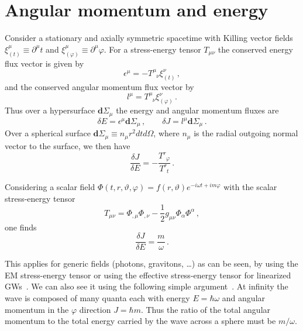 \documentclass[11pt]{article}
\newcommand{\be}{\begin{equation}}
\newcommand{\ee}{\end{equation}}
\numberwithin{equation}{section} %
\begin{document}
\section{Angular momentum and energy\label{appendix_energyangularmomentum}}
Consider a stationary and axially symmetric spacetime with Killing vector fields $\xi_{(t)}^{\mu}\equiv \partial^{\mu} t$ and $\xi_{(\varphi)}^{\mu} \equiv \partial^{\mu} \varphi$. For a stress-energy tensor $T_{\mu\nu}$ the conserved energy flux vector is given by
%
\be
\epsilon^{\mu}=-T^{\mu}_{\phantom{\mu}\nu}\xi^{\nu}_{(t)}\,,
\ee
%
and the conserved angular momentum flux vector by
%
\be
l^{\mu}=T^{\mu}_{\phantom{\mu}\nu}\xi^{\nu}_{(\varphi)}\,.
\ee
%
Thus over a hypersurface $\mathbf{d}\Sigma_{\mu}$ the energy and angular momentum fluxes are
%
\be
\delta E=\epsilon^{\mu} \mathbf{d} \Sigma_{\mu}\,, \qquad \delta J=l^{\mu} \mathbf{d} \Sigma_{\mu}\,.
\ee
%
Over a spherical surface $\mathbf{d}\Sigma_{\mu} \equiv n_{\mu}r^2 dt d\Omega$, where $n_{\mu}$ is the radial outgoing normal vector to the surface, we then have
%
\be
\frac{\delta J}{\delta E}=-\frac{T^{r}_{\phantom{r}\varphi}}{T^{r}_{\phantom{r}t}}\,.
\ee
%  

Considering a scalar field $\Phi(t,r,\vartheta,\varphi)=f(r,\vartheta)e^{-i\omega t+im\varphi}$ with the scalar stress-energy tensor
%
\be
T_{\mu\nu}=\Phi_{,\mu}\Phi_{,\nu}-\frac{1}{2}g_{\mu\nu}\Phi_{\alpha}\Phi^{\alpha}\,,
\ee
%
one finds
%
\be
\frac{\delta J}{\delta E}=\frac{m}{\omega}\,.
\ee
%

This applies for generic fields (photons, gravitons, \dots) as can be seen, by using the EM stress-energy 
tensor or using the effective stress-energy tensor for linearized GWs~\cite{Misner:1974qy}. We can also see it using the 
following simple argument~\cite{Bekenstein:1973mi}. At infinity the wave is composed of many quanta each with energy 
$E=\hbar \omega$ and angular momentum in the $\varphi$ direction $J=\hbar m$. Thus the ratio of the total angular 
momentum to the total energy carried by the wave across a sphere must be $m/\omega$.

\end{document}
